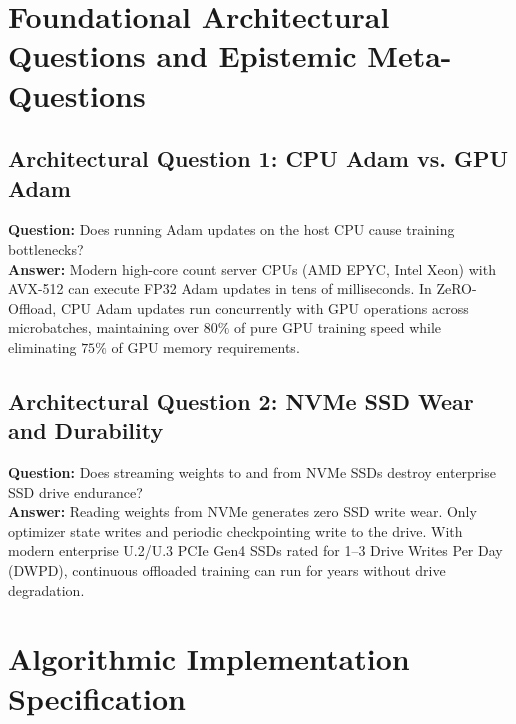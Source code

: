 \documentclass[11pt,a4paper]{article}
\theoremstyle{definition}
\begin{document}
\section{Foundational Architectural Questions and Epistemic Meta-Questions}

\subsection{Architectural Question 1: CPU Adam vs. GPU Adam}
\textbf{Question:} Does running Adam updates on the host CPU cause training bottlenecks?\\
\textbf{Answer:} Modern high-core count server CPUs (AMD EPYC, Intel Xeon) with AVX-512 can execute FP32 Adam updates in tens of milliseconds. In ZeRO-Offload, CPU Adam updates run concurrently with GPU operations across microbatches, maintaining over $80\%$ of pure GPU training speed while eliminating $75\%$ of GPU memory requirements.

\subsection{Architectural Question 2: NVMe SSD Wear and Durability}
\textbf{Question:} Does streaming weights to and from NVMe SSDs destroy enterprise SSD drive endurance?\\
\textbf{Answer:} Reading weights from NVMe generates zero SSD write wear. Only optimizer state writes and periodic checkpointing write to the drive. With modern enterprise U.2/U.3 PCIe Gen4 SSDs rated for 1–3 Drive Writes Per Day (DWPD), continuous offloaded training can run for years without drive degradation.

\section{Algorithmic Implementation Specification}
\end{document}
